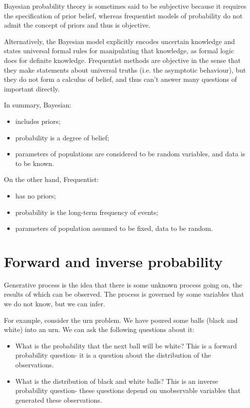 \documentclass[a4paper, openany]{memoir}
\begin{document}
Bayesian probability theory is sometimes said to be subjective because it requires the specification of prior belief, whereas frequentist models of probability do not admit the concept of priors and thus is objective.

Alternatively, the Bayesian model explicitly encodes uncertain knowledge and states universal formal rules for manipulating that knowledge, as formal logic does for definite knowledge. Frequentist methods are objective in the sense that they make statements about universal truths (i.e. the asymptotic behaviour), but they do not form a calculus of belief, and thus can't answer many questions of important directly.

In summary, Bayesian:
\begin{itemize}
    \item includes priors;
    \item probability is a degree of belief;
    \item parameters of populations are considered to be random variables, and data is to be known.
\end{itemize}
On the other hand, Frequentist:
\begin{itemize}
    \item has no priors;
    \item probability is the long-term frequency of events;
    \item parameters of population assumed to be fixed, data to be random.
\end{itemize}
\newpage

\section{Forward and inverse probability}
Generative process is the idea that there is some unknown process going on, the results of which can be observed. The process is governed by some variables that we do not know, but we can infer.

For example, consider the urn problem. We have poured some balls (black and white) into an urn. We can ask the following questions about it:
\begin{itemize}
    \item What is the probability that the next ball will be white? This is a forward probability question- it is a question about the distribution of the observations.
    \item What is the distribution of black and white balls? This is an inverse probability question- these questions depend on unobservable variables that generated these observations.
\end{itemize}
\end{document}
